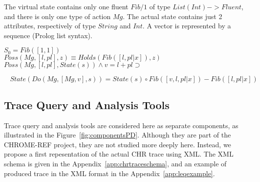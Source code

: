 The virtual state contains only one fluent $Fib/1$ of type $List(Int) -> Fluent$, and there is only one type of action $Mg$. The actual state contains just 2 attributes, respectively of type $String$ and $Int$. A vector is represented by a sequence (Prolog list syntax).









\vspace{4mm}



$
S_0 = Fib([1,1])
$ \\

$
Poss(Mg, [l, pl], z)  \equiv Holds(Fib([l,pl|x]), z) 
$ \\

$
Poss(Mg, [l, pl], State(s)) \land v = l+pl \supset $

$\ \ \ \ State(Do(Mg, [Mg, v], s)) = State(s) \circ Fib([v,l,pl|x]) - Fib([l,pl|x])
$

\subsection{Trace Query and Analysis Tools}





Trace query and analysis tools are considered here as separate components, as illustrated in the Figure~\ref{fig:componentsPD}. Although they are part of the CHROME-REF project, they are not studied more deeply here. Instead, we propose a first repesentation of the actual CHR trace using XML. The XML schema is given in the Appendix~\ref{app:chrtraceschema}, and an example of produced trace in the XML format in the Appendix~\ref{app:leqexample}.




